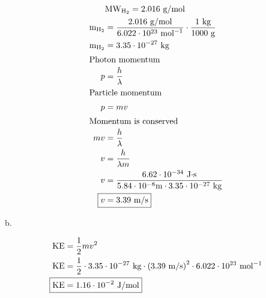 \documentclass[12pt]{article}
\begin{document}
\begin{enumerate}
    \begin{align*}
        & \text{MW}_{\text{H}_2} = 2.016 \text{ g/mol} \\
        \text{m}_{\text{H}_2} &= \frac{2.016 \text{ g/mol}}{6.022 \cdot 10^{23} \text{ mol$^{-1}$}} \cdot \frac{1 \text{ kg}}{1000 \text{ g}} \\
        \text{m}_{\text{H}_2} &= 3.35 \cdot 10^{-27} \text{ kg} \\
        \intertext{Photon momentum}
        p &= \frac{h}{\lambda} \\
        \intertext{Particle momentum}
        p &= mv \\
        \intertext{Momentum is conserved}
        mv &= \frac{h}{\lambda} \\
        v &= \frac{h}{\lambda m} \\
        v &= \frac{6.62 \cdot 10^{-34} \text{ J$\cdot$s}}{5.84 \cdot 10^{-8} \text{m} \cdot 3.35 \cdot 10^{-27} \text{ kg}} \\
        \Aboxed{v &= 3.39 \text{ m/s}}
    \end{align*}

    b.

    \begin{align*}
        \text{KE} &= \frac{1}{2} m v^2 \\
        \text{KE} &= \frac{1}{2} \cdot 3.35 \cdot 10^{-27} \text{ kg} \cdot \left(3.39 \text{ m/s}\right)^2 \cdot 6.022 \cdot 10^{23} \text{ mol$^{-1}$} \\
        \Aboxed{\text{KE} &= 1.16 \cdot 10^{-2} \text{ J/mol}}
    \end{align*}

\end{enumerate}
\end{document}
